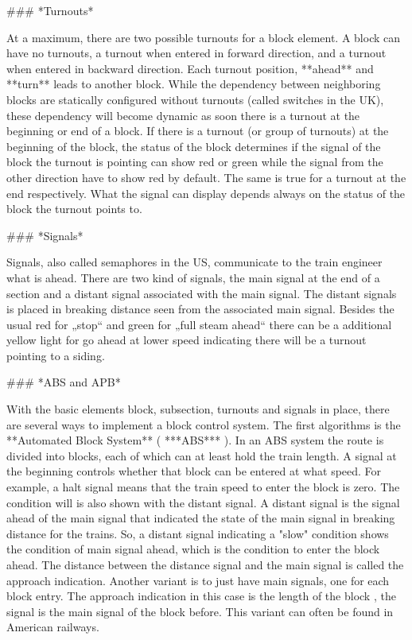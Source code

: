 ### *Turnouts*

At a maximum, there are two possible turnouts for a block element. A block can have no turnouts, a turnout when entered in forward direction, and a turnout when entered in backward direction. Each turnout position, **ahead** and **turn** leads to another block. While the dependency between neighboring blocks are statically configured without turnouts (called switches in the UK), these dependency will become dynamic as soon there is a turnout at the beginning or end of a block. If there is a turnout (or group of turnouts) at the beginning of the block, the status of the block determines if the signal of the block the turnout is pointing can show red or green while the signal from the other direction have to show red by default. The same is true for a turnout at the end respectively. What the signal can display depends always on the status of the block the turnout points to.

### *Signals*

Signals, also called semaphores in the US, communicate to the train engineer what is ahead. There are two kind of signals, the main signal at the end of a section and a distant signal associated with the main signal. The distant signals is placed in breaking distance seen from the associated main signal. Besides the usual red for „stop“ and green for „full steam ahead“ there can be a additional yellow light for go ahead at lower speed indicating there will be a turnout pointing to a siding.

### *ABS and APB*

With the basic elements  block, subsection, turnouts and signals in place, there are several ways to implement a block control system. The first algorithms is the **Automated Block System** ( ***ABS*** ). In an ABS system the route is divided into blocks, each of which can at least hold the train length. A signal at the beginning controls whether that block can be entered at what speed. For example, a halt signal means that the train speed to enter the block is zero. The condition will is also shown with the distant signal. A distant signal is the signal ahead of the main signal that indicated the state of the main signal in breaking distance for the trains. So, a distant signal indicating a "slow" condition shows the condition of main signal ahead, which is the condition to enter the block ahead. The distance between the distance signal and the main signal is called the approach indication. Another variant is to just have main signals, one for each block entry. The approach indication in this case is the length of the block , the signal is the main signal of the block before. This variant can often be found in American railways.

